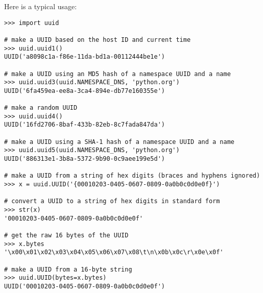 Here is a typical usage:
\begin{verbatim}
>>> import uuid

# make a UUID based on the host ID and current time
>>> uuid.uuid1()
UUID('a8098c1a-f86e-11da-bd1a-00112444be1e')

# make a UUID using an MD5 hash of a namespace UUID and a name
>>> uuid.uuid3(uuid.NAMESPACE_DNS, 'python.org')
UUID('6fa459ea-ee8a-3ca4-894e-db77e160355e')

# make a random UUID
>>> uuid.uuid4()
UUID('16fd2706-8baf-433b-82eb-8c7fada847da')

# make a UUID using a SHA-1 hash of a namespace UUID and a name
>>> uuid.uuid5(uuid.NAMESPACE_DNS, 'python.org')
UUID('886313e1-3b8a-5372-9b90-0c9aee199e5d')

# make a UUID from a string of hex digits (braces and hyphens ignored)
>>> x = uuid.UUID('{00010203-0405-0607-0809-0a0b0c0d0e0f}')

# convert a UUID to a string of hex digits in standard form
>>> str(x)
'00010203-0405-0607-0809-0a0b0c0d0e0f'

# get the raw 16 bytes of the UUID
>>> x.bytes
'\x00\x01\x02\x03\x04\x05\x06\x07\x08\t\n\x0b\x0c\r\x0e\x0f'

# make a UUID from a 16-byte string
>>> uuid.UUID(bytes=x.bytes)
UUID('00010203-0405-0607-0809-0a0b0c0d0e0f')
\end{verbatim}
